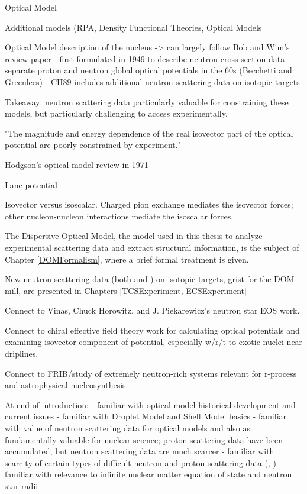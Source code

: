 Optical Model

Additional models (RPA, Density Functional Theories, Optical Models

Optical Model description of the nucleus
-> can largely follow Bob and Wim's review paper
- first formulated in 1949 to describe neutron cross section data
- separate proton and neutron global optical potentials in the 60s (Becchetti
and Greenlees)
- CH89 includes additional neutron scattering data on isotopic targets

Takeaway: neutron scattering data particularly valuable for constraining these
models, but particularly challenging to access experimentally.

"The magnitude and energy dependence of the real isovector part of the
optical potential are poorly constrained by experiment." \cite{Holt16}

Hodgson's optical model review in 1971

Lane potential 

Isovector versus isoscalar. Charged pion exchange mediates the isovector forces;
other nucleon-nucleon interactions mediate the isoscalar forces.

The Dispersive Optical Model, the model used in this thesis to analyze experimental scattering data
and extract structural information, is the subject of Chapter \ref{DOMFormalism}, where a brief
formal treatment is given.

New neutron scattering data (both \tot and \el) on isotopic targets, grist for the DOM mill, are
presented in Chapters \ref{TCSExperiment, ECSExperiment}

Connect to Vinas, Chuck Horowitz, and J. Piekarewicz's neutron star EOS work.

Connect to chiral effective field theory work for calculating optical potentials
and examining isovector component of potential, especially w/r/t to exotic
nuclei near driplines.

Connect to FRIB/study of extremely neutron-rich systems relevant for r-process
and astrophysical nucleosynthesis.

At end of introduction:
- familiar with optical model historical development and current issues
- familiar with Droplet Model and Shell Model basics
- familiar with value of neutron scattering data for optical models and also as
fundamentally valuable for nuclear science; proton scattering data have been
accumulated, but neutron scattering data are much scarcer
- familiar with scarcity of certain types of difficult neutron and proton
scattering data (\tot, \rxnE)
- familiar with relevance to infinite nuclear matter equation of state and
neutron star radii

